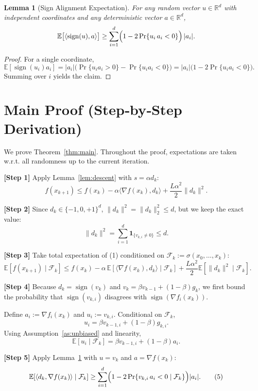 \documentclass{article}
\newtheorem{lemma}{Lemma}
\newcommand{\sign}{\operatorname{sign}}
\newcommand{\E}{\mathbb{E}}
\newcommand{\R}{\mathbb{R}}
\begin{document}
\begin{lemma}[Sign Alignment Expectation]\label{lem:sign}
For any random vector $u\in\R^{d}$ with independent coordinates and any deterministic vector $a\in\R^{d}$,
\[
\E\bigl[\langle \sign(u),a\rangle\bigr]\ge
\sum_{i=1}^{d}\Bigl(1-2\Pr\{u_{i}\,a_{i}<0\}\Bigr)\,|a_{i}|.
\]
\end{lemma}
\begin{proof}
For a single coordinate,
\[
\E[\sign(u_{i})a_{i}]=|a_{i}|\bigl(\Pr\{u_{i}a_{i}>0\}-\Pr\{u_{i}a_{i}<0\}\bigr)
=|a_{i}|\bigl(1-2\Pr\{u_{i}a_{i}<0\}\bigr).
\]
Summing over $i$ yields the claim. \qedhere
\end{proof}

\section*{Main Proof (Step‑by‑Step Derivation)}
We prove Theorem~\ref{thm:main}. Throughout the proof, expectations are taken w.r.t. all randomness up to the current iteration.

\noindent\textbf{[Step 1]} Apply Lemma~\ref{lem:descent} with $s=\alpha d_{k}$:
\[
f(x_{k+1})\le f(x_{k})-\alpha\langle \nabla f(x_{k}),d_{k}\rangle+\frac{L\alpha^{2}}{2}\|d_{k}\|^{2}.
\tag{1}
\]

\noindent\textbf{[Step 2]} Since $d_{k}\in\{-1,0,+1\}^{d}$, $\|d_{k}\|^{2}= \|d_{k}\|_{2}^{2}\le d$, but we keep the exact value:
\[
\|d_{k}\|^{2}= \sum_{i=1}^{d}\mathbf{1}_{\{v_{k,i}\neq0\}}\le d.
\tag{2}
\]

\noindent\textbf{[Step 3]} Take total expectation of (1) conditioned on $\mathcal{F}_{k}:=\sigma(x_{0},\dots,x_{k})$:
\[
\E\!\left[f(x_{k+1})\mid\mathcal{F}_{k}\right]
\le f(x_{k})-\alpha\,\E\!\left[\langle \nabla f(x_{k}),d_{k}\rangle\mid\mathcal{F}_{k}\right]
+\frac{L\alpha^{2}}{2}\E\!\left[\|d_{k}\|^{2}\mid\mathcal{F}_{k}\right].
\tag{3}
\]

\noindent\textbf{[Step 4]} Because $d_{k}=\sign(v_{k})$ and $v_{k}= \beta v_{k-1}+(1-\beta)g_{k}$, we first bound the probability that $\sign(v_{k,i})$ disagrees with $\sign(\nabla f_{i}(x_{k}))$.

Define $a_{i}:=\nabla f_{i}(x_{k})$ and $u_{i}:=v_{k,i}$. Conditional on $\mathcal{F}_{k}$,
\[
u_{i}= \beta v_{k-1,i}+(1-\beta)g_{k,i}.
\]
Using Assumption~\ref{as:unbiased} and linearity,
\[
\E[u_{i}\mid\mathcal{F}_{k}]
= \beta v_{k-1,i}+(1-\beta)a_{i}.
\tag{4}
\]

\noindent\textbf{[Step 5]} Apply Lemma~\ref{lem:sign} with $u=v_{k}$ and $a=\nabla f(x_{k})$:
\[
\E\!\left[\langle d_{k},\nabla f(x_{k})\rangle\mid\mathcal{F}_{k}\right]
\ge \sum_{i=1}^{d}\Bigl(1-2\Pr\{v_{k,i}\,a_{i}<0\mid\mathcal{F}_{k}\}\Bigr)|a_{i}|.
\tag{5}
\]
\end{document}
